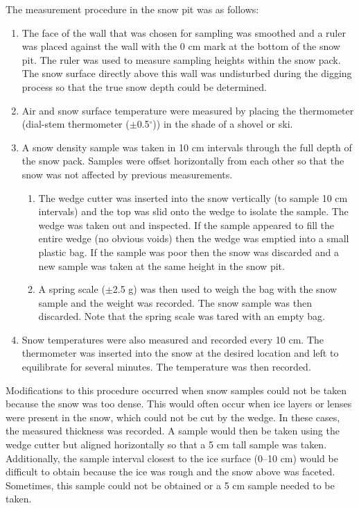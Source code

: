 \documentclass{sfuthesis}
\begin{document}
The measurement procedure in the snow pit was as follows:
\begin{enumerate}
\item The face of the wall that was chosen for sampling was smoothed and a ruler was placed against the wall with the 0 cm mark at the bottom of the snow pit. The ruler was used to measure sampling heights within the snow pack. The snow surface directly above this wall was undisturbed during the digging process so that the true snow depth could be determined. 
\item Air and snow surface temperature were measured by placing the thermometer (dial-stem thermometer ($\pm$0.5$^\circ$)) in the shade of a shovel or ski. 
\item A snow density sample was taken in 10 cm intervals through the full depth of the snow pack. Samples were offset horizontally from each other so that the snow was not affected by previous measurements. 
	\begin{enumerate}
	\item The wedge cutter was inserted into the snow vertically (to sample 10 cm intervals) and the top was slid onto the wedge to isolate the sample. The wedge was taken out and inspected. If the sample appeared to fill the entire wedge (no obvious voids) then the wedge was emptied into a small plastic bag. If the sample was poor then the snow was discarded and a new sample was taken at the same height in the snow pit. 
	\item A spring scale ($\pm$2.5 g) was then used to weigh the bag with the snow sample and the weight was recorded. The snow sample was then discarded. Note that the spring scale was tared with an empty bag.
	\end{enumerate}
\item Snow temperatures were also measured and recorded every 10 cm. The thermometer was inserted into the snow at the desired location and left to equilibrate for several minutes. The temperature was then recorded.
\end{enumerate}

Modifications to this procedure occurred when snow samples could not be taken because the snow was too dense. This would often occur when ice layers or lenses were present in the snow, which could not be cut by the wedge. In these cases, the measured thickness was recorded. A sample would then be taken using the wedge cutter but aligned horizontally so that a 5 cm tall sample was taken. Additionally, the sample interval closest to the ice surface (0--10 cm) would be difficult to obtain because the ice was rough and the snow above was faceted. Sometimes, this sample could not be obtained or a 5 cm sample needed to be taken. 
\end{document}
